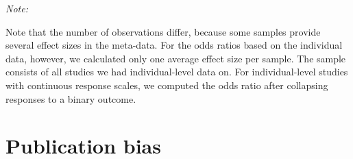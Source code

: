 \documentclass[
  doc,floatsintext]{apa6}
\begin{document}
\begin{table}

\caption{\label{tab:meta-odds-extended}Individual-level studies with binary response scales and Likert scale ratings collapsed to binary outcome}
\centering
\begin{threeparttable}
\begin{tablenotes}
\item \textit{Note: } 
\item Note that the number of observations differ, because some samples provide several effect sizes in the meta-data. For the odds ratios based on the individual data, however, we calculated only one average effect size per sample. The sample consists of all studies we had individual-level data on. For individual-level studies with continuous response scales, we computed the odds ratio after collapsing responses to a binary outcome.
\end{tablenotes}
\end{threeparttable}
\end{table}

\clearpage

\section{Publication bias}\label{publication-bias}

\FloatBarrier
\end{document}
